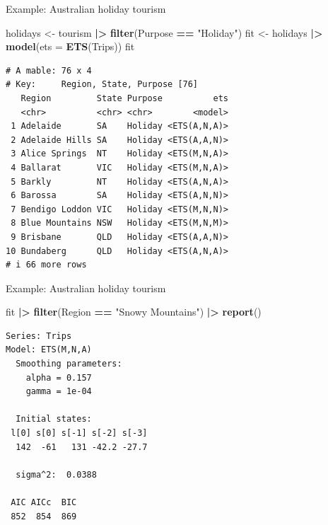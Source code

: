 \documentclass[
  14pt,
  ignorenonframetext,
  aspectratio=169,
]{beamer}
\newenvironment{Shaded}{\begin{snugshade}}{\end{snugshade}}
\newcommand{\AttributeTok}[1]{\textcolor[rgb]{0.13,0.29,0.53}{#1}}
\newcommand{\FunctionTok}[1]{\textcolor[rgb]{0.13,0.29,0.53}{\textbf{#1}}}
\newcommand{\NormalTok}[1]{#1}
\newcommand{\OtherTok}[1]{\textcolor[rgb]{0.56,0.35,0.01}{#1}}
\newcommand{\SpecialCharTok}[1]{\textcolor[rgb]{0.81,0.36,0.00}{\textbf{#1}}}
\newcommand{\StringTok}[1]{\textcolor[rgb]{0.31,0.60,0.02}{#1}}
\renewenvironment{Shaded}{\vspace*{0.15cm}\color{black}\fontsize{10}{10}\sf\begin{snugshade}\color{black}}{\end{snugshade}}
\begin{document}
\begin{frame}[fragile]{Example: Australian holiday tourism}
\protect{}\label{example-australian-holiday-tourism}
\fontsize{9}{10}\sf

\begin{Shaded}
\begin{Highlighting}[]
\NormalTok{holidays }\OtherTok{\textless{}{-}}\NormalTok{ tourism }\SpecialCharTok{|\textgreater{}}
  \FunctionTok{filter}\NormalTok{(Purpose }\SpecialCharTok{==} \StringTok{"Holiday"}\NormalTok{)}
\NormalTok{fit }\OtherTok{\textless{}{-}}\NormalTok{ holidays }\SpecialCharTok{|\textgreater{}} \FunctionTok{model}\NormalTok{(}\AttributeTok{ets =} \FunctionTok{ETS}\NormalTok{(Trips))}
\NormalTok{fit}
\end{Highlighting}
\end{Shaded}

\begin{verbatim}
# A mable: 76 x 4
# Key:     Region, State, Purpose [76]
   Region         State Purpose          ets
   <chr>          <chr> <chr>        <model>
 1 Adelaide       SA    Holiday <ETS(A,N,A)>
 2 Adelaide Hills SA    Holiday <ETS(A,A,N)>
 3 Alice Springs  NT    Holiday <ETS(M,N,A)>
 4 Ballarat       VIC   Holiday <ETS(M,N,A)>
 5 Barkly         NT    Holiday <ETS(A,N,A)>
 6 Barossa        SA    Holiday <ETS(A,N,N)>
 7 Bendigo Loddon VIC   Holiday <ETS(M,N,N)>
 8 Blue Mountains NSW   Holiday <ETS(M,N,M)>
 9 Brisbane       QLD   Holiday <ETS(A,A,N)>
10 Bundaberg      QLD   Holiday <ETS(A,N,A)>
# i 66 more rows
\end{verbatim}
\end{frame}

\begin{frame}[fragile]{Example: Australian holiday tourism}
\protect{}\label{example-australian-holiday-tourism-1}
\fontsize{9}{10}\sf

\begin{Shaded}
\begin{Highlighting}[]
\NormalTok{fit }\SpecialCharTok{|\textgreater{}}
  \FunctionTok{filter}\NormalTok{(Region }\SpecialCharTok{==} \StringTok{"Snowy Mountains"}\NormalTok{) }\SpecialCharTok{|\textgreater{}}
  \FunctionTok{report}\NormalTok{()}
\end{Highlighting}
\end{Shaded}

\begin{verbatim}
Series: Trips 
Model: ETS(M,N,A) 
  Smoothing parameters:
    alpha = 0.157 
    gamma = 1e-04 

  Initial states:
 l[0] s[0] s[-1] s[-2] s[-3]
  142  -61   131 -42.2 -27.7

  sigma^2:  0.0388

 AIC AICc  BIC 
 852  854  869 
\end{verbatim}
\end{frame}
\end{document}

